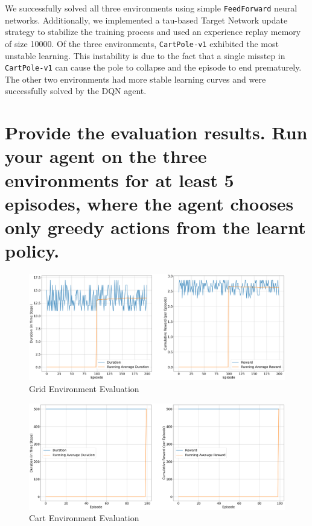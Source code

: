 \documentclass{article} %
\begin{document}
We successfully solved all three environments using simple \verb|FeedForward| neural networks. Additionally, we implemented a tau-based Target Network update strategy to stabilize the training process and used an experience replay memory of size 10000. Of the three environments, \verb|CartPole-v1| exhibited the most unstable learning. This instability is due to the fact that a single misstep in \verb|CartPole-v1| can cause the pole to collapse and the episode to end prematurely. The other two environments had more stable learning curves and were successfully solved by the DQN agent.

\section{Provide the evaluation results. Run your agent on the three environments for at least 5 episodes, where the agent chooses only greedy actions from the learnt policy.}

\begin{figure}[H]
    \begin{center}
        \includegraphics[width=\textwidth]{grid_evaluate.png}
    \end{center}
    \caption{Grid Environment Evaluation}
\end{figure}

\begin{figure}[H]
    \begin{center}
        \includegraphics[width=\textwidth]{cart_evaluate.png}
    \end{center}
    \caption{Cart Environment Evaluation}
\end{figure}
\end{document}

